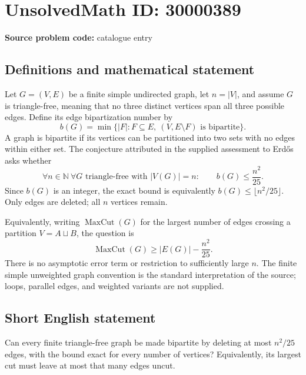 \documentclass[11pt]{article}
\newcommand{\N}{\mathbb{N}}
\begin{document}
\section*{UnsolvedMath ID: 30000389}
\textbf{Source problem code:} catalogue entry
\subsection{Definitions and mathematical statement}
Let $G=(V,E)$ be a finite simple undirected graph, let $n=|V|$, and assume $G$ is triangle-free, meaning that no three distinct vertices span all three possible edges. Define its edge bipartization number by
\[
 b(G)=\min\{|F|:F\subseteq E,\ (V,E\setminus F)\text{ is bipartite}\}.
\]
A graph is bipartite if its vertices can be partitioned into two sets with no edges within either set. The conjecture attributed in the supplied assessment to Erd\H{o}s asks whether
\[
 \forall n\in\N\ \forall G\text{ triangle-free with }|V(G)|=n:
 \qquad b(G)\le\frac{n^2}{25}.
\]
Since $b(G)$ is an integer, the exact bound is equivalently $b(G)\le\lfloor n^2/25\rfloor$. Only edges are deleted; all $n$ vertices remain.

Equivalently, writing $\operatorname{MaxCut}(G)$ for the largest number of edges crossing a partition $V=A\sqcup B$, the question is
\[
 \operatorname{MaxCut}(G)\ge |E(G)|-\frac{n^2}{25}.
\]
There is no asymptotic error term or restriction to sufficiently large $n$. The finite simple unweighted graph convention is the standard interpretation of the source; loops, parallel edges, and weighted variants are not supplied.
\subsection{Short English statement}
Can every finite triangle-free graph be made bipartite by deleting at most $n^2/25$ edges, with the bound exact for every number of vertices? Equivalently, its largest cut must leave at most that many edges uncut.
\end{document}
